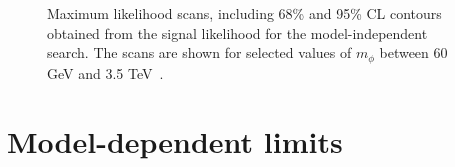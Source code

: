\begin{figure}[!hbtp]
\caption[Plots of the maximum likelihood scans for the model-independent search.]{Maximum likelihood scans, including 68\% and 95\% CL contours obtained from the signal likelihood for the model-independent search. The scans are shown for selected values of $m_{\phi}$ between 60 GeV and 3.5 TeV~\cite{CMS:2022rbd}.}
\label{fig:2d_likelihood_scans}
\end{figure}

\section{Model-dependent limits}

